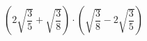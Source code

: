 \begin{ex}[type=expression]
	\begin{condition}
		\( \left( 2\sqrt{\dfrac{3}{5}}+\sqrt{\dfrac{3}{8}} \right)\cdot\left( \sqrt{\dfrac{3}{8}}-2\sqrt{\dfrac{3}{5}} \right) \)
	\end{condition}
\end{ex}